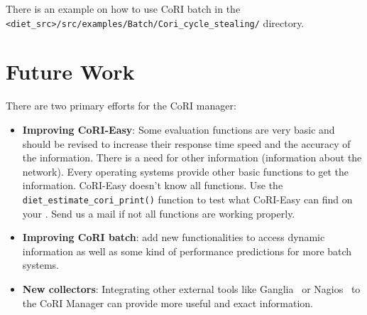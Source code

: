There is an example on how to use CoRI batch in
the\\ \verb!<diet_src>/src/examples/Batch/Cori_cycle_stealing/! directory.

\section{Future Work}

There are two primary efforts for the CoRI manager:
\begin{itemize}
\item \textbf{Improving CoRI-Easy}: Some evaluation functions are very basic
  and should be revised to increase their response time speed and the accuracy
  of the information. There is a need for other information (\ie information
  about the network). Every operating systems provide other basic functions to
  get the information. CoRI-Easy doesn't know all functions. Use the
  \texttt{diet\_estimate\_cori\_print()} function to test what CoRI-Easy can
  find on your \sed. Send us a mail if not  all functions are working properly.

\item \textbf{Improving CoRI batch}: add new functionalities to access dynamic
  information as well as some kind of performance predictions for more batch
  systems.

\item \textbf{New collectors}: Integrating other external tools like
  Ganglia~\cite{Ganglia} or Nagios~\cite{Nagios} to the CoRI Manager can
  provide more useful and exact information.
\end{itemize}

